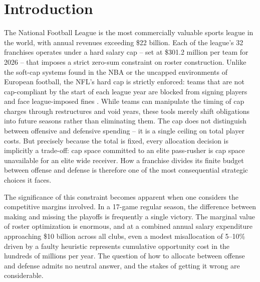\documentclass[12pt,a4paper]{article}
\begin{document}
\section{Introduction}
\label{sec:introduction}

The National Football League is the most commercially valuable sports league in the world, with annual revenues exceeding \$22 billion. Each of the league's 32 franchises operates under a hard salary cap -- set at \$301.2 million per team for 2026 \citep{nfl2026cap} -- that imposes a strict zero-sum constraint on roster construction. Unlike the soft-cap systems found in the NBA or the uncapped environments of European football, the NFL's hard cap is strictly enforced: teams that are not cap-compliant by the start of each league year are blocked from signing players and face league-imposed fines \citep{nflcba2020}. While teams can manipulate the timing of cap charges through restructures and void years, these tools merely shift obligations into future seasons rather than eliminating them. The cap does not distinguish between offensive and defensive spending -- it is a single ceiling on total player costs. But precisely because the total is fixed, every allocation decision is implicitly a trade-off: cap space committed to an elite pass-rusher is cap space unavailable for an elite wide receiver. How a franchise divides its finite budget between offense and defense is therefore one of the most consequential strategic choices it faces.

The significance of this constraint becomes apparent when one considers the competitive margins involved. In a 17-game regular season, the difference between making and missing the playoffs is frequently a single victory. The marginal value of roster optimization is enormous, and at a combined annual salary expenditure approaching \$10 billion across all clubs, even a modest misallocation of 5--10\% driven by a faulty heuristic represents cumulative opportunity cost in the hundreds of millions per year. The question of how to allocate between offense and defense admits no neutral answer, and the stakes of getting it wrong are considerable.
\end{document}
